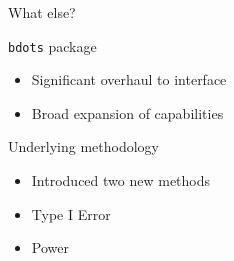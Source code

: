 \documentclass{beamer}
\newcommand{\xt}{\texttt}
\providecommand{\cn}[1]{\textcolor{blue}{#1}}
\begin{document}
%
%





\begin{frame}{What else?}

\xt{bdots} package 
\begin{itemize}
\item Significant overhaul to interface
\item Broad expansion of capabilities
\end{itemize}
\vspace{4mm}

Underlying methodology
\begin{itemize}
\item Introduced two new methods
\item Type I Error
\item Power
\end{itemize}

\end{frame}
\end{document}
